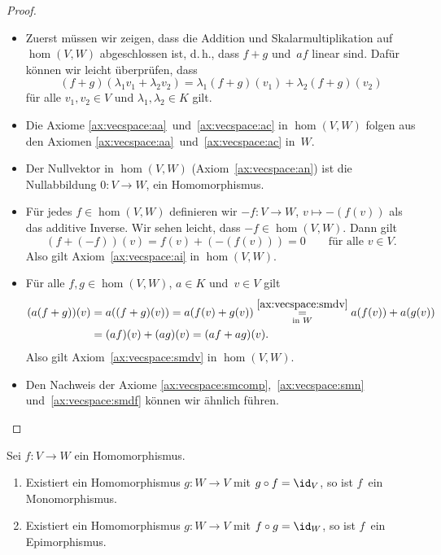 \documentclass[a4paper]{article}
\begin{document}
\begin{proof}\leavevmode
    \begin{itemize}
        \item Zuerst müssen wir zeigen, dass die Addition und Skalarmultiplikation auf $\hom(V,W)$ abgeschlossen ist, d.\,h., dass $f+g$ und~$af$ linear sind. Dafür können wir leicht überprüfen, dass
              \begin{equation*}
                  (f+g)(\lambda_1v_1+\lambda_2v_2) = \lambda_1(f+g)(v_1)+\lambda_2(f+g)(v_2)
              \end{equation*}
              für alle $v_1,v_2 \in V$ und $\lambda_1,\lambda_2 \in K$ gilt.
        \item Die Axiome \ref{ax:vecspace:aa}~und~\ref{ax:vecspace:ac} in $\hom(V,W)$ folgen aus den Axiomen \ref{ax:vecspace:aa}~und~\ref{ax:vecspace:ac} in~$W$.
        \item Der Nullvektor in $\hom(V,W)$ (Axiom~\ref{ax:vecspace:an}) ist die Nullabbildung $0\colon V \to W$, ein Homomorphismus.
        \item Für jedes $f \in \hom(V,W)$ definieren wir $-f\colon V \to W$, $v \mapsto -(f(v))$ als das additive Inverse. Wir sehen leicht, dass $-f \in \hom(V,W)$. Dann gilt
              \begin{equation*}
                  (f+(-f))(v) = f(v)+(-(f(v))) = 0 \qquad\text{für alle } v \in V.
              \end{equation*}
              Also gilt Axiom~\ref{ax:vecspace:ai} in $\hom(V,W)$.
        \item Für alle $f,g \in \hom(V,W)$, $a \in K$ und~$v \in V$ gilt
              \begin{align*}
                  (a(f+g))(v) & = a((f+g)(v)) = a(f(v)+g(v)) \underset{\text{in }W}{\overset{\ref{ax:vecspace:smdv}}{=}} a(f(v))+a(g(v)) \\
                              & = (af)(v)+(ag)(v) = (af+ag)(v).
              \end{align*}
              Also gilt Axiom~\ref{ax:vecspace:smdv} in $\hom(V,W)$.
        \item Den Nachweis der Axiome \ref{ax:vecspace:smcomp},~\ref{ax:vecspace:smn} und~\ref{ax:vecspace:smdf} können wir ähnlich führen.\qedhere
    \end{itemize}
\end{proof}

\begin{lemma}\label{lem:hom:id}
    Sei $f\colon V \to W$ ein Homomorphismus.
    \begin{enumerate}
        \item Existiert ein Homomorphismus $g\colon W \to V$ mit $g\circ f = \id_V$, so ist $f$~ein Monomorphismus.
        \item Existiert ein Homomorphismus $g\colon W \to V$ mit $f\circ g = \id_W$, so ist $f$~ein Epimorphismus.
    \end{enumerate}
\end{lemma}
\end{document}
